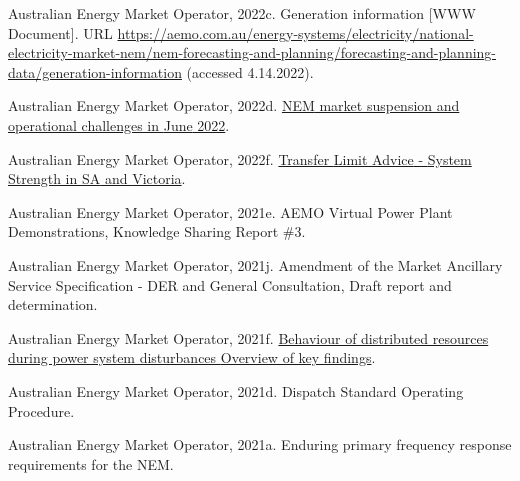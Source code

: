 \documentclass[12pt,a4paper,]{report}
\newlength{\cslhangindent}
\newenvironment{CSLReferences}[2] %
 {%
  \setlength{\parindent}{0pt}
  \ifodd #1 \everypar{\setlength{\hangindent}{\cslhangindent}}\ignorespaces\fi
  \ifnum #2 > 0
  \setlength{\parskip}{#2\baselineskip}
  \fi
 }%
 {}
\begin{document}
\begin{CSLReferences}{1}{0}
\leavevmode{}%
Australian Energy Market Operator, 2022c. Generation information {[}WWW
Document{]}. URL
\url{https://aemo.com.au/energy-systems/electricity/national-electricity-market-nem/nem-forecasting-and-planning/forecasting-and-planning-data/generation-information}
(accessed 4.14.2022).

\leavevmode{}%
Australian Energy Market Operator, 2022d.
\href{https://aemo.com.au/-/media/files/electricity/nem/market_notices_and_events/market_event_reports/2022/nem-market-suspension-and-operational-challenges-in-june-2022.pdf?la=en}{{NEM}
market suspension and operational challenges in {June} 2022}.

\leavevmode{}%
Australian Energy Market Operator, 2022f.
\href{https://www.aemo.com.au/-/media/files/electricity/nem/security_and_reliability/congestion-information/transfer-limit-advice-system-strength.pdf?la=en}{Transfer
{Limit Advice} - {System Strength} in {SA} and {Victoria}}.

\leavevmode{}%
Australian Energy Market Operator, 2021e. {AEMO Virtual Power Plant
Demonstrations}, {Knowledge Sharing Report} \#3.

\leavevmode{}%
Australian Energy Market Operator, 2021j. Amendment of the {Market
Ancillary Service Specification} - {DER} and {General Consultation},
{Draft} report and determination.

\leavevmode{}%
Australian Energy Market Operator, 2021f.
\href{https://aemo.com.au/en/initiatives/major-programs/nem-distributed-energy-resources-der-program/operations/der-behaviour-during-disturbances}{Behaviour
of distributed resources during power system disturbances {Overview} of
key findings}.

\leavevmode{}%
Australian Energy Market Operator, 2021d. Dispatch {Standard Operating
Procedure}.

\leavevmode{}%
Australian Energy Market Operator, 2021a. Enduring primary frequency
response requirements for the {NEM}.


\end{CSLReferences}
\end{document}
